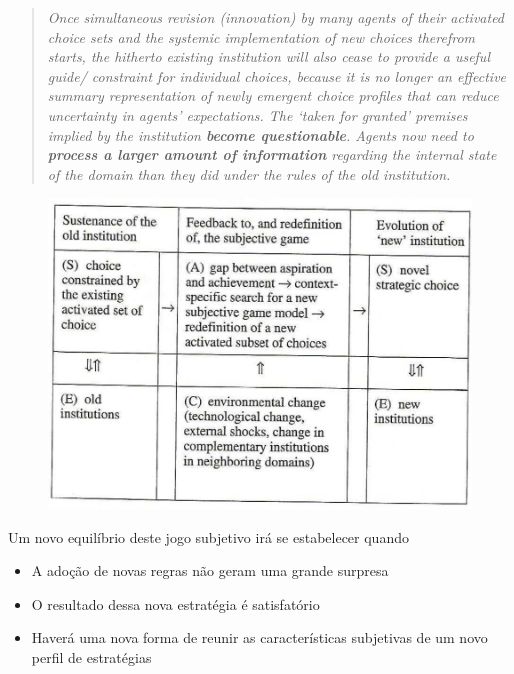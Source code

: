 \documentclass[9pt,twocolumn,twoside,lineno]{style}
\begin{document}
\begin{quotation}
	\textit{Once simultaneous revision (innovation) by many agents of their activated
	choice sets and the systemic implementation of new choices therefrom starts,
	the hitherto existing institution will also cease to provide a useful guide/
	constraint for individual choices, because it is no longer an effective summary
	representation of newly emergent choice profiles that can reduce uncertainty in
	agents' expectations. The `taken for granted' premises implied by the institution \textbf{become questionable}. Agents now need to \textbf{process a larger amount of information} regarding the internal state of the domain than they did under the
	rules of the old institution.} 
\end{quotation}

\begin{figure}[H]
	\centering
	\includegraphics[width=\linewidth]{screenshot002}
	\caption[Mecanismo da evolução institucional]{}
	\caption{}
	\label{fig:screenshot002}
\end{figure}


Um novo equilíbrio deste jogo subjetivo irá se estabelecer quando
\begin{itemize}
	\item A adoção de novas regras não geram uma grande surpresa
	\item O resultado dessa nova estratégia é satisfatório
	\item Haverá uma nova forma de reunir as características subjetivas de um novo perfil de estratégias
\end{itemize}
\end{document}
